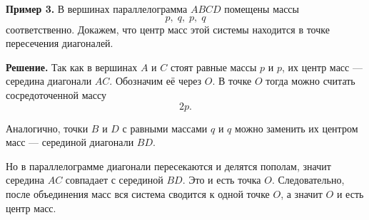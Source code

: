 \bigskip

\textbf{Пример 3.}
В вершинах параллелограмма $ABCD$ помещены массы
\[
p,\; q,\; p,\; q
\]
соответственно. Докажем, что центр масс этой системы находится в точке пересечения диагоналей.

\medskip

\textbf{Решение.}
Так как в вершинах $A$ и $C$ стоят равные массы $p$ и $p$, их центр масс --- середина диагонали $AC$.
Обозначим её через $O$.
В точке $O$ тогда можно считать сосредоточенной массу
\[
2p.
\]

Аналогично, точки $B$ и $D$ с равными массами $q$ и $q$ можно заменить их центром масс --- серединой диагонали $BD$. 

Но в параллелограмме диагонали пересекаются и делятся пополам, значит середина $AC$ совпадает с серединой $BD$.
Это и есть точка $O$. Следовательно, после объединения масс вся система сводится к одной точке $O$, а значит $O$ и есть центр масс.